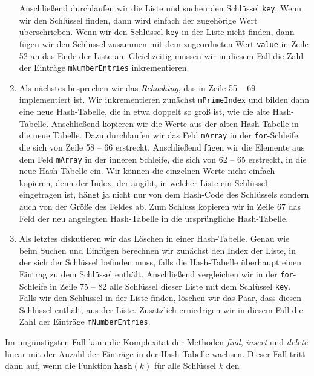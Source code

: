 \begin{enumerate}
      Anschlie{\ss}end durchlaufen wir die Liste und suchen den Schl\"ussel \texttt{key}.
      Wenn wir den Schl\"ussel finden, dann wird einfach der zugeh\"orige Wert \"uberschrieben.
      Wenn wir den Schl\"ussel \texttt{key} in der Liste nicht finden, dann f\"ugen wir den
      Schl\"ussel zusammen mit dem zugeordneten Wert \texttt{value} in Zeile 52 an das Ende der Liste an.
      Gleichzeitig m\"ussen wir in diesem Fall die Zahl der Eintr\"age \texttt{mNumberEntries}
      inkrementieren.
\item Als n\"achstes besprechen wir das \emph{Rehashing}, das in Zeile 55 -- 69
      implementiert ist.  Wir inkrementieren zun\"achst \texttt{mPrimeIndex} und
      bilden dann eine neue Hash-Tabelle, die in etwa doppelt so gro{\ss} ist, wie die alte
      Hash-Tabelle. Anschlie{\ss}end kopieren wir die Werte aus der alten Hash-Tabelle in die
      neue Tabelle.  Dazu durchlaufen wir das Feld \texttt{mArray} in der
      \texttt{for}-Schleife, die sich von Zeile 58 -- 66 erstreckt.
      Anschlie{\ss}end f\"ugen wir die Elemente aus dem Feld \texttt{mArray} in der inneren
      Schleife, die sich von 62 -- 65 erstreckt, in die neue Hash-Tabelle ein.
      Wir k\"onnen die einzelnen Werte nicht einfach kopieren, denn der Index, der angibt,
      in welcher Liste ein Schl\"ussel eingetragen ist, h\"angt ja nicht nur von dem
      Hash-Code des Schl\"ussels sondern auch von der Gr\"o{\ss}e des Feldes ab.
      Zum Schluss kopieren wir in Zeile 67  das Feld der neu angelegten Hash-Tabelle in die
      urspr\"ungliche Hash-Tabelle.
\item Als letztes diskutieren wir das L\"oschen in einer Hash-Tabelle.
      Genau wie beim Suchen und Einf\"ugen berechnen wir zun\"achst den Index der Liste, in
      der sich der Schl\"ussel befinden muss, falls die Hash-Tabelle \"uberhaupt einen Eintrag
      zu dem Schl\"ussel enth\"alt.  Anschlie{\ss}end vergleichen wir in der \texttt{for}-Schleife
      in Zeile 75 -- 82 alle Schl\"ussel dieser Liste mit dem Schl\"ussel \texttt{key}.
      Falls wir den Schl\"ussel in der Liste finden, l\"oschen wir das Paar, dass diesen
      Schl\"ussel enth\"alt, aus  der Liste.  Zus\"atzlich erniedrigen wir in diesem Fall die
      Zahl der Eintr\"age \texttt{mNumberEntries}.
      
\end{enumerate}
Im ung\"unstigsten Fall kann die Komplexit\"at der Methoden \textsl{find}, \textsl{insert} und
\textsl{delete} linear mit der Anzahl der Eintr\"age in der Hash-Tabelle wachsen.  Dieser
Fall tritt dann auf, wenn die Funktion $\texttt{hash}(k)$ f\"ur alle Schl\"ussel $k$ den
